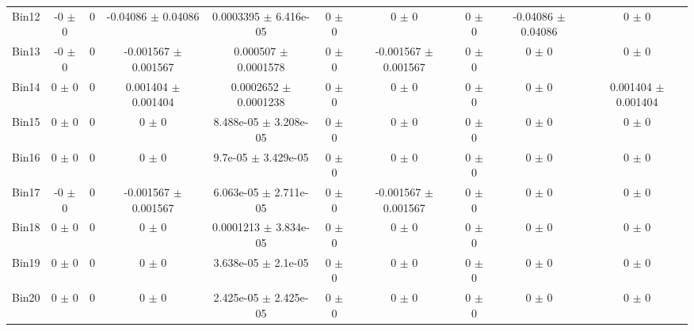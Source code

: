 \begin{tabular}{@{\extracolsep{4pt}}lccccccccc@{}}
     Bin12 & -0 $\pm$ 0 & 0 & -0.04086 $\pm$ 0.04086 & 0.0003395 $\pm$ 6.416e-05 & 0 $\pm$ 0 & 0 $\pm$ 0 & 0 $\pm$ 0 & -0.04086 $\pm$ 0.04086 & 0 $\pm$ 0 \\ 
     Bin13 & -0 $\pm$ 0 & 0 & -0.001567 $\pm$ 0.001567 & 0.000507 $\pm$ 0.0001578 & 0 $\pm$ 0 & -0.001567 $\pm$ 0.001567 & 0 $\pm$ 0 & 0 $\pm$ 0 & 0 $\pm$ 0 \\ 
     Bin14 & 0 $\pm$ 0 & 0 & 0.001404 $\pm$ 0.001404 & 0.0002652 $\pm$ 0.0001238 & 0 $\pm$ 0 & 0 $\pm$ 0 & 0 $\pm$ 0 & 0 $\pm$ 0 & 0.001404 $\pm$ 0.001404 \\ 
     Bin15 & 0 $\pm$ 0 & 0 & 0 $\pm$ 0 & 8.488e-05 $\pm$ 3.208e-05 & 0 $\pm$ 0 & 0 $\pm$ 0 & 0 $\pm$ 0 & 0 $\pm$ 0 & 0 $\pm$ 0 \\ 
     Bin16 & 0 $\pm$ 0 & 0 & 0 $\pm$ 0 & 9.7e-05 $\pm$ 3.429e-05 & 0 $\pm$ 0 & 0 $\pm$ 0 & 0 $\pm$ 0 & 0 $\pm$ 0 & 0 $\pm$ 0 \\ 
     Bin17 & -0 $\pm$ 0 & 0 & -0.001567 $\pm$ 0.001567 & 6.063e-05 $\pm$ 2.711e-05 & 0 $\pm$ 0 & -0.001567 $\pm$ 0.001567 & 0 $\pm$ 0 & 0 $\pm$ 0 & 0 $\pm$ 0 \\ 
     Bin18 & 0 $\pm$ 0 & 0 & 0 $\pm$ 0 & 0.0001213 $\pm$ 3.834e-05 & 0 $\pm$ 0 & 0 $\pm$ 0 & 0 $\pm$ 0 & 0 $\pm$ 0 & 0 $\pm$ 0 \\ 
     Bin19 & 0 $\pm$ 0 & 0 & 0 $\pm$ 0 & 3.638e-05 $\pm$ 2.1e-05 & 0 $\pm$ 0 & 0 $\pm$ 0 & 0 $\pm$ 0 & 0 $\pm$ 0 & 0 $\pm$ 0 \\ 
     Bin20 & 0 $\pm$ 0 & 0 & 0 $\pm$ 0 & 2.425e-05 $\pm$ 2.425e-05 & 0 $\pm$ 0 & 0 $\pm$ 0 & 0 $\pm$ 0 & 0 $\pm$ 0 & 0 $\pm$ 0 \\ 
\hline\hline
  \end{tabular}
